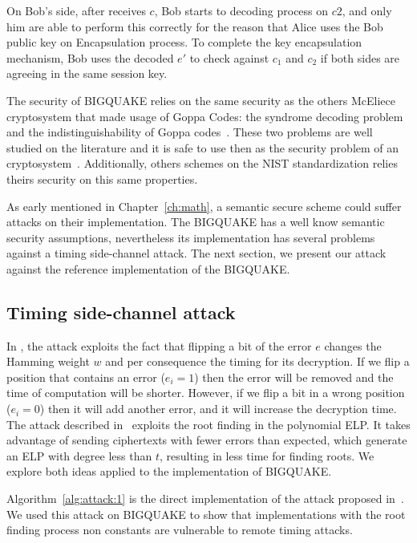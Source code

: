On Bob's side, after receives $c$, Bob starts to decoding process on $c2$, and only him are able to perform this correctly for the reason that Alice uses the Bob public key on Encapsulation process. To complete the key encapsulation mechanism, Bob uses the decoded $e'$ to check against $c_1$ and $c_2$ if both sides are agreeing in the same session key.

The security of BIGQUAKE relies on the same security as the others McEliece cryptosystem that made usage of Goppa Codes: the syndrome decoding problem and the indistinguishability of Goppa codes~\cite{bardet2017big}. These two problems are well studied on the literature and it is safe to use then as the security problem of an cryptosystem~\cite{bernstein2008attacking, faugere2013distinguisher}. Additionally, others schemes on the NIST standardization relies theirs security on this same properties\cite{bernstein2017classic}.

As early mentioned in Chapter~\ref{ch:math}, a semantic secure scheme could suffer attacks on their implementation. The BIGQUAKE has a well know semantic security assumptions, nevertheless its implementation has several problems against a timing side-channel attack. The next section, we present our attack against the reference implementation of the BIGQUAKE. 

\subsection{Timing side-channel attack}
In \cite{shoufan2009timing}, the attack exploits the fact that flipping a bit of the error $e$ changes the Hamming weight $w$ and per consequence the timing for its decryption. If we flip a position that contains an error ($e_i = 1$) then the error will be removed and the time of computation will be shorter. However, if we flip a bit in a wrong position ($e_i = 0$) then it will add another error, and it will increase the decryption time. The attack described in~\cite{bucerzan2017improved} exploits the root finding in the polynomial ELP. It takes advantage of sending ciphertexts with fewer errors than expected, which generate an ELP with degree less than $t$, resulting in less time for finding roots. We explore both ideas applied to the implementation of BIGQUAKE.

Algorithm~\ref{alg:attack:1} is the direct implementation of the attack proposed in~\cite{shoufan2009timing}. We used this attack on BIGQUAKE to show that implementations with the root finding process non constants are vulnerable to remote timing attacks.

